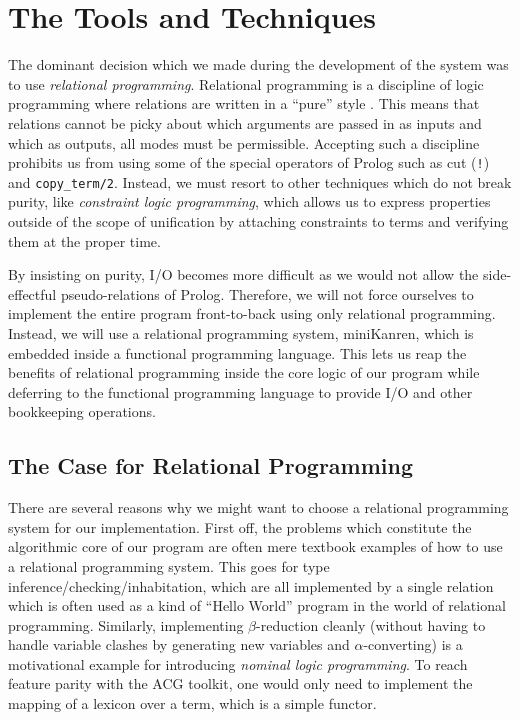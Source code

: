 \section{The Tools and Techniques}

The dominant decision which we made during the development of the system
was to use \emph{relational programming}. Relational programming is a
discipline of logic programming where relations are written in a
``pure'' style \cite{byrd2010relational}. This means that relations
cannot be picky about which arguments are passed in as inputs and which
as outputs, all modes must be permissible. Accepting such a discipline
prohibits us from using some of the special operators of Prolog such as
cut (\texttt{!}) and \texttt{copy\_term/2}. Instead, we must resort to
other techniques which do not break purity, like \emph{constraint logic
  programming}, which allows us to express properties outside of the
scope of unification by attaching constraints to terms and verifying
them at the proper time.

By insisting on purity, I/O becomes more difficult as we would not allow
the side-effectful pseudo-relations of Prolog. Therefore, we will not
force ourselves to implement the entire program front-to-back using only
relational programming. Instead, we will use a relational programming
system, miniKanren, which is embedded inside a functional programming
language. This lets us reap the benefits of relational programming
inside the core logic of our program while deferring to the functional
programming language to provide I/O and other bookkeeping operations.

\subsection{The Case for Relational Programming}

There are several reasons why we might want to choose a relational
programming system for our implementation. First off, the problems which
constitute the algorithmic core of our program are often mere textbook
examples of how to use a relational programming system. This goes for
type inference/checking/inhabitation, which are all implemented by a
single relation which is often used as a kind of ``Hello World'' program
in the world of relational programming. Similarly, implementing
$\beta$-reduction cleanly (without having to handle variable clashes by
generating new variables and $\alpha$-converting) is a motivational
example for introducing \emph{nominal logic programming}. To reach
feature parity with the ACG toolkit, one would only need to implement
the mapping of a lexicon over a term, which is a simple functor.

